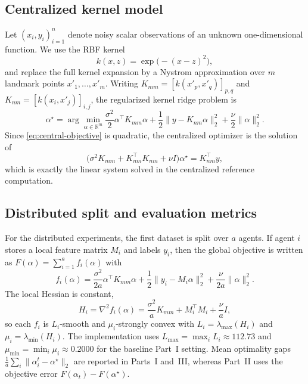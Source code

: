 \documentclass[11pt,a4paper]{article}
\begin{document}
\subsection{Centralized kernel model}
Let $(x_i,y_i)_{i=1}^n$ denote noisy scalar observations of an unknown one-dimensional function. We use the RBF kernel
\begin{equation}
    k(x,z)=\exp\bigl(-(x-z)^2\bigr),
\end{equation}
and replace the full kernel expansion by a Nystrom approximation over $m$ landmark points $x'_1,\dots,x'_m$. Writing $K_{mm}=[k(x'_p,x'_q)]_{p,q}$ and $K_{nm}=[k(x_i,x'_j)]_{i,j}$, the regularized kernel ridge problem is
\begin{equation}
    \alpha^\star = \arg\min_{\alpha\in\mathbb{R}^m}
    \frac{\sigma^2}{2}\alpha^\top K_{mm}\alpha
    + \frac{1}{2}\lVert y-K_{nm}\alpha\rVert_2^2
    + \frac{\nu}{2}\lVert \alpha\rVert_2^2.
    \label{eq:central-objective}
\end{equation}
Since \eqref{eq:central-objective} is quadratic, the centralized optimizer is the solution of
\begin{equation}
    \bigl(\sigma^2 K_{mm}+K_{nm}^\top K_{nm}+\nu I\bigr)\alpha^\star = K_{nm}^\top y,
    \label{eq:central-linear-system}
\end{equation}
which is exactly the linear system solved in the centralized reference computation.

\subsection{Distributed split and evaluation metrics}
For the distributed experiments, the first dataset is split over $a$ agents. If agent $i$ stores a local feature matrix $M_i$ and labels $y_i$, then the global objective is written as $F(\alpha)=\sum_{i=1}^a f_i(\alpha)$ with
\begin{equation}
    f_i(\alpha)=
    \frac{\sigma^2}{2a}\alpha^\top K_{mm}\alpha
    + \frac{1}{2}\lVert y_i-M_i\alpha\rVert_2^2
    + \frac{\nu}{2a}\lVert \alpha\rVert_2^2.
    \label{eq:local-objective}
\end{equation}
The local Hessian is constant,
\begin{equation}
    H_i = \nabla^2 f_i(\alpha)=\frac{\sigma^2}{a}K_{mm}+M_i^\top M_i+\frac{\nu}{a}I,
\end{equation}
so each $f_i$ is $L_i$-smooth and $\mu_i$-strongly convex with $L_i=\lambda_{\max}(H_i)$ and $\mu_i=\lambda_{\min}(H_i)$. The implementation uses $L_{\max}=\max_i L_i\approx\num{112.73}$ and $\mu_{\min}=\min_i \mu_i\approx\num{0.2000}$ for the baseline Part~I setting. Mean optimality gaps $\frac{1}{a}\sum_i\lVert \alpha_i^t-\alpha^\star\rVert_2$ are reported in Parts~I and~III, whereas Part~II uses the objective error $F(\alpha_t)-F(\alpha^\star)$.
\end{document}

